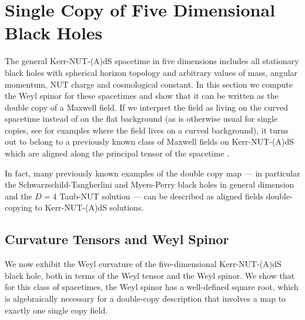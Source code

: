 \section{Single Copy of Five Dimensional Black Holes} \label{5D:sec:FiveDDoubleCopy} 
%
The general Kerr-NUT-(A)dS spacetime in five dimensions includes all stationary black holes with
spherical horizon topology and arbitrary values of mass, angular momentum, NUT charge and
cosmological constant.
%
In this section we compute the Weyl spinor for these spacetimes and show that it can be written as the double copy
of a Maxwell field. If we interpret the field as living on the curved
spacetime instead of on the flat background (as is otherwise usual for single copies, see \cite{Alawadhi:2020jrv, Bahjat-Abbas:2017htu,
Carrillo-Gonzalez:2017iyj, Prabhu:2020avf, Adamo:2017nia, Alkac:2021bav, Han:2022mze} for examples
where the field lives on a curved background), it turns out to belong to a
previously known class of Maxwell fields on Kerr-NUT-(A)dS which are aligned along the principal tensor of the
spacetime \cite{Krtous:2007xg}. 

In fact, many previously known examples of the double copy map --- in particular the Schwarzschild-Tangherlini and
Myers-Perry black holes in general dimension and the $D = 4$ Taub-NUT solution --- can be described as aligned
fields double-copying to Kerr-NUT-(A)dS solutions. 


\subsection{Curvature Tensors and Weyl Spinor}

We now exhibit the Weyl curvature of the five-dimensional
Kerr-NUT-(A)dS black hole, both in terms of the Weyl tensor and the Weyl spinor. We 
show that for this class of spacetimes, the Weyl spinor has a well-defined square root,
which is algebraically necessary for a double-copy description that involves a map to
exactly one single copy field.

